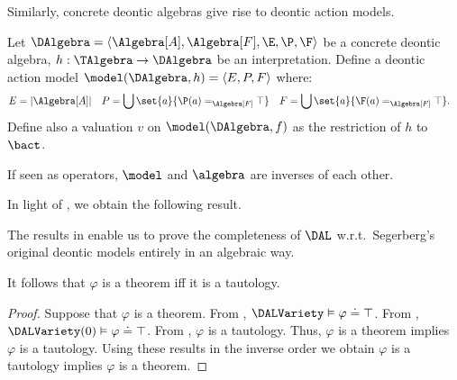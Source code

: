 Similarly, concrete deontic algebras give rise to deontic action models.


\medskip
\begin{definition}\label{def:alg2mod}
	Let $\DAlgebra = \langle \Algebra[A], \Algebra[F],  \E, \P, \F \rangle$ be a concrete deontic algebra, $h: \TAlgebra \to \DAlgebra$ be an interpretation.
	Define a deontic action model $\model(\DAlgebra, h) = \langle E, P, F \rangle$ where:
	\begin{align*}
		E &= |\Algebra[A]| &
		P &= \bigcup \set{a}{\P(a) =_{\Algebra[F]} \top} &
		F &= \bigcup \set{a}{\F(a) =_{\Algebra[F]} \top}.
	\end{align*}
	Define also a valuation $v$ on $\model(\DAlgebra, f)$ as the restriction of $h$ to $\bact$.
\end{definition}
\medskip

If seen as operators, $\model$ and $\algebra$ are inverses of each other.


\medskip
{}
\medskip

In light of , we obtain the following result.


\medskip
{}
\medskip



\medskip

The results in  enable us to prove the completeness of $\DAL$ w.r.t.\ Segerberg's original deontic models entirely in an algebraic way.

\medskip
\begin{theorem} It follows that $\varphi$ is a theorem iff it is a tautology.
\end{theorem}
\begin{proof}
	Suppose that $\varphi$ is a theorem.
	From , $\DALVariety \vDash \varphi \doteq \top$.
	From , $\DALVariety(0) \vDash \varphi \doteq \top$.
	From , $\varphi$ is a tautology.
	Thus, $\varphi$ is a theorem implies $\varphi$ is a tautology.
	Using these results in the inverse order we obtain $\varphi$ is a tautology implies $\varphi$ is a theorem.
\end{proof}
